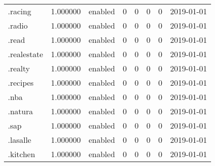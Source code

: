 \begin{tabular}{lrlrrrrl}
.racing                   &          1.000000 &         enabled &                           0 &                           0 &                           0 &                   0 &           2019-01-01 \\
.radio                    &          1.000000 &         enabled &                           0 &                           0 &                           0 &                   0 &           2019-01-01 \\
.read                     &          1.000000 &         enabled &                           0 &                           0 &                           0 &                   0 &           2019-01-01 \\
.realestate               &          1.000000 &         enabled &                           0 &                           0 &                           0 &                   0 &           2019-01-01 \\
.realty                   &          1.000000 &         enabled &                           0 &                           0 &                           0 &                   0 &           2019-01-01 \\
.recipes                  &          1.000000 &         enabled &                           0 &                           0 &                           0 &                   0 &           2019-01-01 \\
.nba                      &          1.000000 &         enabled &                           0 &                           0 &                           0 &                   0 &           2019-01-01 \\
.natura                   &          1.000000 &         enabled &                           0 &                           0 &                           0 &                   0 &           2019-01-01 \\
.sap                      &          1.000000 &         enabled &                           0 &                           0 &                           0 &                   0 &           2019-01-01 \\
.lasalle                  &          1.000000 &         enabled &                           0 &                           0 &                           0 &                   0 &           2019-01-01 \\
.kitchen                  &          1.000000 &         enabled &                           0 &                           0 &                           0 &                   0 &           2019-01-01 \\

\end{tabular}
